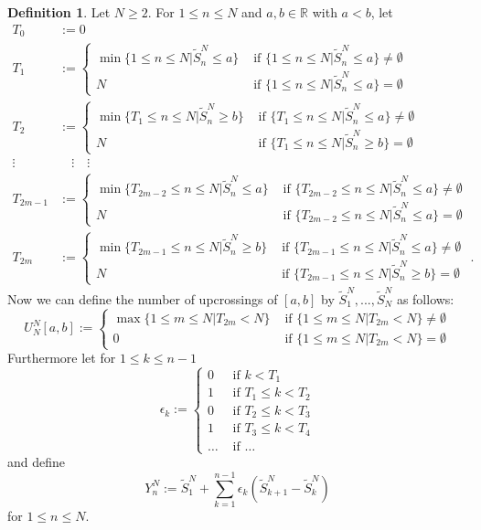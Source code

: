 \documentclass[phd]{UWMThesis}
\newcommand{\StN}[1]{\tilde{S}_{#1}^N}
\newcommand{\YN}[1]{Y_{#1}^N}
\newcommand{\UNab}[1]{U_{#1}^N[a,b]}
\newcommand{\mdot}{\textrm{ .}}
\renewcommand{\.}{\textrm{ .}}
\theoremstyle{definition}
\newtheorem{defn}[thm]{Definition}
\numberwithin{thm}{chapter}
\begin{document}
\begin{defn}
	Let $N\geq 2$. For $1\leq n\leq N$ and $a, b \in \mathbb{R}$ with $a < b$, let 
	\begin{align*}
	T_0 &:= 0\\
	T_1 &:= \begin{cases} 
	\min\{1\leq n\leq N | \StN{n}\leq a\} & \textrm{ if } \{1\leq n\leq N | \StN{n}\leq a\}\neq \emptyset\\
	N & \textrm{ if } \{1\leq n\leq N | \StN{n}\leq a\}= \emptyset
	\end{cases}\\	
	T_2 &:= \begin{cases} 
	\min\{T_1\leq n\leq N | \StN{n}\geq b\} & \textrm{ if } \{T_1\leq n\leq N | \StN{n}\leq a\}\neq \emptyset\\
	N & \textrm{ if } \{T_1\leq n\leq N | \StN{n}\geq b\} = \emptyset
	\end{cases}\\	
	\vdots &\quad \vdots \quad \vdots	\\
	T_{2m-1} &:= \begin{cases} 
	\min\{T_{2m-2}\leq n\leq N | \StN{n}\leq a\} & \textrm{ if } \{T_{2m-2}\leq n\leq N | \StN{n}\leq a\}\neq \emptyset\\
	N & \textrm{ if } \{T_{2m-2}\leq n\leq N | \StN{n}\leq a\}= \emptyset
	\end{cases}\\	
	T_{2m} &:= \begin{cases} 
	\min\{T_{2m-1}\leq n\leq N | \StN{n}\geq b\} & \textrm{ if } \{T_{2m-1}\leq n\leq N | \StN{n}\leq a\}\neq \emptyset\\
	N & \textrm{ if } \{T_{2m-1}\leq n\leq N | \StN{n}\geq b\} = \emptyset
	\end{cases}\mdot
	\end{align*}
	Now we can define the number of upcrossings of $[a, b]$ by $\StN{1}, ..., \StN{N}$ as follows:
	\[
	\UNab{N} :=\begin{cases}  
	\max\{1\leq m \leq N | T_{2m} < N\} & \textrm{ if } \{1\leq m \leq N | T_{2m} < N\}\neq \emptyset\\
	0 &  \textrm{ if } \{1\leq m \leq N | T_{2m} < N\} = \emptyset
	\end{cases}
	\]
	Furthermore let for $1\leq k\leq n-1$
	\[ \epsilon_k := \begin{cases} 
	0 & \textrm{ if } k < T_1 \\
	1 & \textrm{ if } T_1 \leq k < T_2\\
	0 & \textrm{ if } T_2 \leq k < T_3\\
	1 & \textrm{ if } T_3 \leq k < T_4\\
	\dots & \textrm{ if } \dots
	\end{cases}
	\]
	and define
	$$\YN{n} := \StN{1} + \sum\limits_{k=1}^{n-1} \epsilon_k (\StN{k+1}-\StN{k})$$
	for $1\leq n\leq N$. 	
\end{defn}
\end{document}

